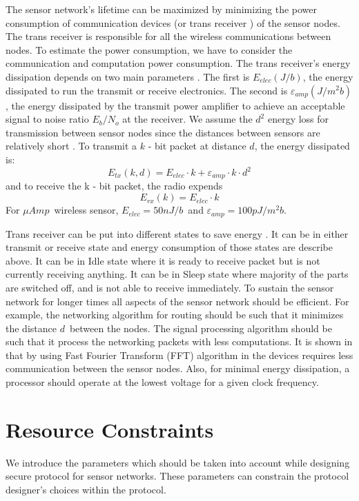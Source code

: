	The sensor network's lifetime can be maximized by minimizing the power consumption of communication devices (or trans receiver ) of the sensor nodes.
	The trans receiver is responsible for all the wireless communications between nodes.
	To estimate the power consumption, we have to consider the communication and computation power consumption.
	The trans receiver's energy dissipation depends on two main parameters \cite{wang2002energy}.
	The first is $E_{elec} (J/b)$, the energy dissipated to run the transmit or receive electronics.
	The second is $\varepsilon_{amp} (J/m^2 b)$, the energy dissipated by the transmit power amplifier to achieve an acceptable signal to noise ratio $E_{b} / N_{o} $ at the receiver.
	We assume the $d^2$ energy loss for transmission between sensor nodes since the distances between sensors are relatively short \cite{ettus1998system}. 
	To transmit a $k$ - bit packet at distance $d$, the energy dissipated is:
	\begin{equation}
		E_{tx}(k, d) = E_{elec} \cdot k + \varepsilon_{amp} \cdot k \cdot d^{2}
	\end{equation}
	and to receive the k - bit packet, the radio expends
	\begin{equation}
		E_{rx}(k) = E_{elec} \cdot k
	\end{equation}
	For $\mu Amp$\ wireless sensor, $E_{elec} = 50nJ/b$\ and $\varepsilon_{amp} = 100pJ/m^2 b$.

	Trans receiver can be put into different states to save energy \cite{karl2007protocols}.
	It can be in either transmit or receive state and energy consumption of those states are describe above.
	It can be in Idle state where it is ready to receive packet but is not currently receiving anything.
	It can be in Sleep state where majority of the parts are switched off, and is not able to receive immediately. 
 	To sustain the sensor network for longer times all aspects of the sensor network should be efficient.
	For example, the networking algorithm for routing should be such that it minimizes the distance $d$\ between the nodes.
	The signal processing algorithm should be such that it process the networking packets with less computations.
	It is shown in \cite{wang2002energy} that by using Fast Fourier Transform (FFT) algorithm in the devices requires less communication between the sensor nodes.
	Also, for minimal energy dissipation, a processor should operate at the lowest voltage for a given clock frequency.

\section{Resource Constraints}
	\label{sec:aggregate-adversary}
	We introduce the parameters which should be taken into account while designing secure protocol for sensor networks.  
	These parameters can constrain the protocol designer's choices within the protocol.

